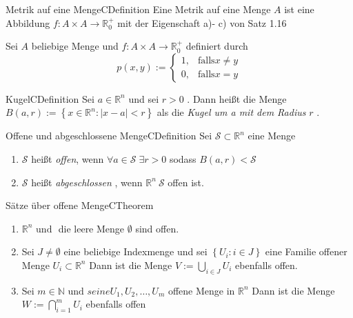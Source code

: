 \documentclass[11.5 pt, a4paper]{memoir}
\begin{document}
\begin{ibox}{Metrik auf eine Menge}{CDefinition}
    Eine Metrik auf eine Menge $ A $ ist eine Abbildung $ f: A \times A 
    \to \mathbb{R}_{0}^{+}$ mit der Eigenschaft a)- c) von Satz 1.16 
\end{ibox}
Sei $ A $ beliebige Menge und  $ f: A \times A \to \mathbb{R}_{0}^{+}$
definiert durch $$ p(x,y) := \begin{cases}
    1, &\text{falls} x\neq y \\
    0, &\text{falls} x = y
\end{cases}
 $$
 \begin{ibox}{Kugel}{CDefinition}
     Sei $ a \in \mathbb{R}^{n} $ und sei $ r>0 $ . Dann heißt die Menge $ 
     B(a,r) := \left\{ x \in \mathbb{R}^{n} :\left| x-a \right|< r\right\} $ als die \textit{Kugel um a mit dem Radius } $ r $ .
 \end{ibox}
\begin{ibox}{Offene und abgeschlossene Menge}{CDefinition}
    Sei $ \mathcal{S} \subset \mathbb{R}^{n}$ eine Menge
    \begin{enumerate}[label=\alph*)]
        \item $ \mathcal{S}  $ heißt  \textit{offen}, wenn $ \forall a \in
            \mathcal{S}\; \exists r > 0 $ sodass $ B(a,r) < \mathcal{S}  $ 
        \item $ \mathcal{S} $ heißt \textit{abgeschlossen }, wenn $ 
            \mathbb{R}^n \ \mathcal{S}  $ offen ist. 
      \end{enumerate}
\end{ibox}
\begin{ibox}{Sätze über offene Menge}{CTheorem}
    \begin{enumerate}[label=\alph*)]
        \item $ \mathbb{R}^n \text{ und } $ die leere Menge $ \emptyset $ 
            sind offen.
        \item Sei $ J \neq \emptyset $ eine beliebige Indexmenge und sei 
            $ \left\{ U_{i} : i \in J \right\}  $ eine Familie offener Menge
            $ U_{i} \subset \mathbb{R}^n $  Dann ist die Menge $ V := 
            \bigcup\limits_{i \in J}^{} U_i $ ebenfalls offen. 
        \item Sei $ m \in \mathbb{N} \text{ und } seine U_1, U_2, \dots 
            , U_{m}$ offene Menge in $ \mathbb{R}^n $ Dann ist die Menge $ 
            W:= \bigcap\limits_{i =1}^{m} U_{i}  $ ebenfalls offen
    \end{enumerate}
\end{ibox}
\end{document}
